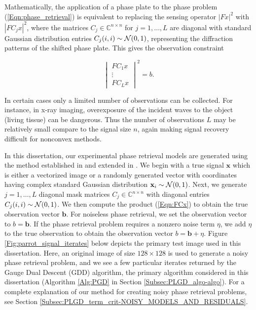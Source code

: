 Mathematically, the application of a phase plate to the phase problem (\ref{Eqn:phase_retrieval}) is equivalent to replacing the sensing operator $|Fx|^2$ with $|FC_jx|^2$, where the matrices $C_j \in \mathbb{C}^{n \times n}$ for $j = 1, \ldots, L$ are diagonal with standard Gaussian distribution entries $C_j(i,i) \sim {\mathcal N}(0, 1)$, representing the diffraction patterns of the shifted phase plate.  This gives the observation constraint

\begin{equation}		\label{Eqn:FCx}
	\begin{vmatrix}
		FC_1x \\ \vdots \\ FC_Lx
	\end{vmatrix}^2
	= b.
\end{equation}

In certain cases only a limited number of observations can be collected.  For instance, in x-ray imaging, overexposure of the incident waves to the object (living tissue) can be dangerous.  Thus the number of observations $L$ may be relatively small compare to the signal size $n$, again making signal recovery difficult for nonconvex methods.





In this dissertation, our experimental phase retrieval models are generated using the method established in \cite{DBLP:journals/tit/CandesLS15} and extended in \cite{DBLP:journals/siamsc/FriedlanderM16}.  
We begin with a true signal $\mathbf{x}$ which is either a vectorized image or a randomly generated vector with coordinates having complex standard Gaussian distribution $\mathbf{x}_i \sim {\mathcal N}(0, 1)$.
Next, we generate $j = 1, \ldots,  L$ diagonal mask matrices $C_j \in \mathbb{C}^{n \times n}$ with diagonal entries $C_j(i,i) \sim {\mathcal N}(0, 1)$.
We then compute the product (\ref{Eqn:FCx}) to obtain the true observation vector $\mathbf{b}$.
For noiseless phase retrieval, we set the observation vector to $b = \mathbf{b}$.
If the phase retrieval problem requires a nonzero noise term $\eta$, we add $\eta$ to the true observation to obtain the observation vector $b = \mathbf{b} + \eta$.
Figure \ref{Fig:parrot_signal_iterates} below depicts the primary test image used in this dissertation.
Here, an original image of size $128 \times 128$ is used to generate a noisy phase retrieval problem, and we see a few particular iterates returned by the Gauge Dual Descent (GDD) algorithm, the primary algorithm considered in this dissertation (Algorithm \ref{Alg:PGD} in Section \ref{Subsec:PLGD_algo-algo}).  
For a complete explanation of our method for creating noisy phase retrieval problems, see Section \ref{Subsec:PLGD_term_crit-NOISY_MODELS_AND_RESIDUALS}.

